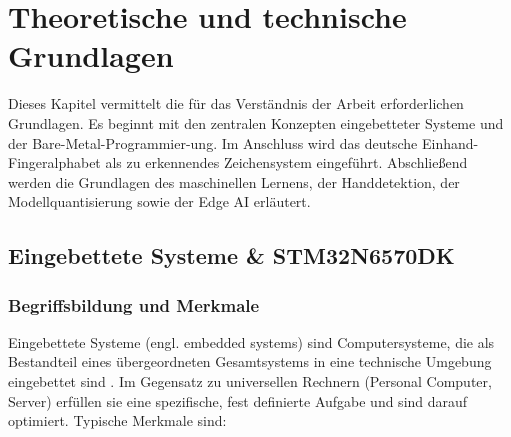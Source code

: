 \chapter{Theoretische und technische Grundlagen}\label{ch:grundlagen}

Dieses Kapitel vermittelt die für das Verständnis der Arbeit erforderlichen Grundlagen. Es beginnt mit den zentralen Konzepten eingebetteter Systeme und der Bare-Metal-Programmier-ung.  Im Anschluss wird das deutsche Einhand-Fingeralphabet als zu erkennendes Zeichensystem eingeführt. Abschließend werden die Grundlagen des maschinellen Lernens, der \linebreak Handdetektion, der Modellquantisierung sowie der Edge AI erläutert.

\section{Eingebettete Systeme \& STM32N6570DK}\label{sec:eingebettete-systeme}
\subsection{Begriffsbildung und Merkmale}\label{sub:begriffsbildung-merkmale}

Eingebettete Systeme (engl. embedded systems) sind Computersysteme, die als Bestandteil eines übergeordneten Gesamtsystems in eine technische Umgebung eingebettet sind \cite[S. 2]{marwedel2021}. Im Gegensatz zu universellen Rechnern (Personal Computer, Server) erfüllen sie eine spezifische, fest definierte Aufgabe und sind darauf optimiert. Typische Merkmale sind:

